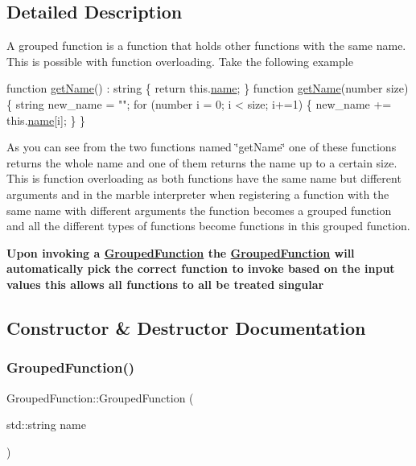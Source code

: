 \subsection{Detailed Description}
A grouped function is a function that holds other functions with the same name. This is possible with function overloading. Take the following example


\begin{DoxyCode}
\textcolor{keyword}{function} \hyperlink{classFunction_a5b7d859d767e8a9c19fc5b81a0d10395}{getName}() : string \{ \textcolor{keywordflow}{return} this.\hyperlink{classFunction_a161d1ceb4f67f3222caf429fea7b71f1}{name}; \}
\textcolor{keyword}{function} \hyperlink{classFunction_a5b7d859d767e8a9c19fc5b81a0d10395}{getName}(number size) \{ \textcolor{keywordtype}{string} new\_name = \textcolor{stringliteral}{""}; \textcolor{keywordflow}{for} (number i = 0; i < size; i+=1) \{ new\_name 
      += this.\hyperlink{classFunction_a161d1ceb4f67f3222caf429fea7b71f1}{name}[i]; \} \} 
\end{DoxyCode}


As you can see from the two functions named \char`\"{}get\+Name\char`\"{} one of these functions returns the whole name and one of them returns the name up to a certain size. This is function overloading as both functions have the same name but different arguments and in the marble interpreter when registering a function with the same name with different arguments the function becomes a grouped function and all the different types of functions become functions in this grouped function.

{\bfseries Upon invoking a \hyperlink{classGroupedFunction}{Grouped\+Function} the \hyperlink{classGroupedFunction}{Grouped\+Function} will automatically pick the correct function to invoke based on the input values this allows all functions to all be treated singular } 

\subsection{Constructor \& Destructor Documentation}
\mbox{\label{classGroupedFunction_a5c0b6a884019fdf2eb5caab86e0fec9c}} 
\subsubsection{\texorpdfstring{Grouped\+Function()}{GroupedFunction()}}
{\footnotesize\ttfamily Grouped\+Function\+::\+Grouped\+Function (\begin{DoxyParamCaption}\item[{std\+::string}]{name }\end{DoxyParamCaption})}

